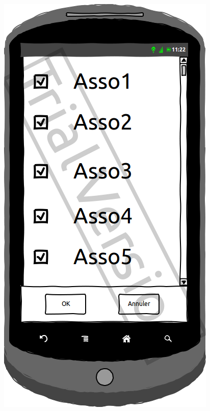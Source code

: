 \documentclass[a4paper, 11px]{article}
\begin{document}
\begin{figure}[htbp]
\begin{minipage}[c]{.50\linewidth}
\begin{center}
			\includegraphics[scale=0.3]{../../Sketch/Android/Filtre.png}
		\end{center}
	\end{minipage}
\end{figure}
\vfill
\clearpage
\end{document}
